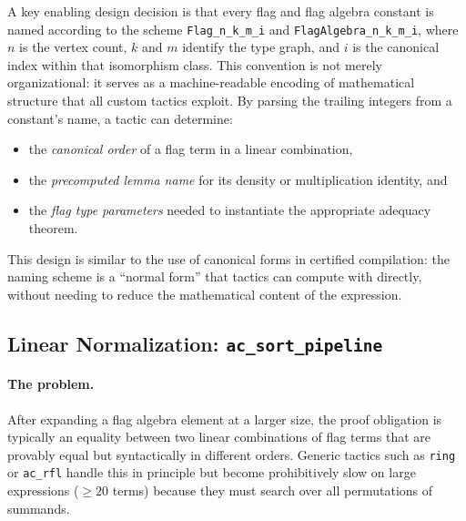 \documentclass{article}
\newcommand{\lean}[1]{\texttt{#1}}
\begin{document}
A key enabling design decision is that every flag and flag algebra constant is
named according to the scheme \lean{Flag\_n\_k\_m\_i} and
\lean{FlagAlgebra\_n\_k\_m\_i}, where $n$ is the vertex count, $k$ and $m$
identify the type graph, and $i$ is the canonical index within that
isomorphism class.  This convention is not merely organizational: it serves as
a machine-readable encoding of mathematical structure that all custom tactics
exploit.  By parsing the trailing integers from a constant's name, a tactic can
determine:
\begin{itemize}
  \item the \emph{canonical order} of a flag term in a linear combination,
  \item the \emph{precomputed lemma name} for its density or multiplication
    identity, and
  \item the \emph{flag type parameters} needed to instantiate the appropriate
    adequacy theorem.
\end{itemize}
This design is similar to the use of canonical forms in certified compilation:
the naming scheme is a ``normal form'' that tactics can compute with directly,
without needing to reduce the mathematical content of the expression.

\subsection{Linear Normalization: \lean{ac\_sort\_pipeline}}

\paragraph{The problem.}
After expanding a flag algebra element at a larger size, the proof obligation
is typically an equality between two linear combinations of flag terms that are
provably equal but syntactically in different orders.  Generic tactics such as
\lean{ring} or \lean{ac\_rfl} handle this in principle but become prohibitively
slow on large expressions ($\geq 20$ terms) because they must search over all
permutations of summands.
\end{document}
